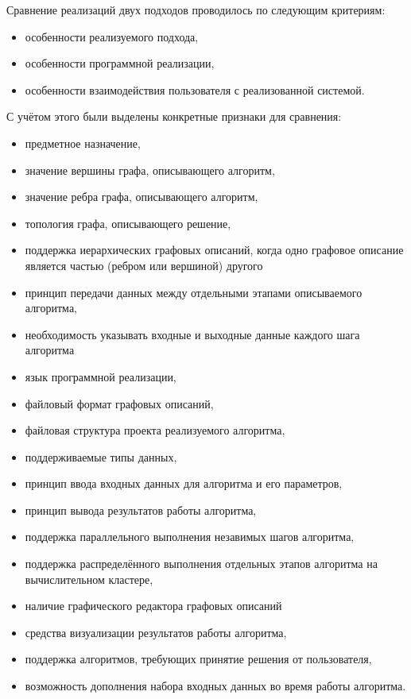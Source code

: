 Сравнение реализаций двух подходов проводилось по следующим критериям:
\begin{itemize}
    \item особенности реализуемого подхода,
    \item особенности программной реализации,
    \item особенности взаимодействия пользователя с реализованной системой.
\end{itemize}
С учётом этого были выделены конкретные признаки для сравнения:
\begin{itemize}
    \item предметное назначение,
    \item значение вершины графа, описывающего алгоритм,
    \item значение ребра графа, описывающего алгоритм,
    \item топология графа, описывающего решение,
    \item поддержка иерархических графовых описаний, когда одно графовое описание является частью (ребром или вершиной) другого
    \item принцип передачи данных между отдельными этапами описываемого алгоритма,
    \item необходимость указывать входные и выходные данные каждого шага алгоритма
    \item язык программной реализации,
    \item файловый формат графовых описаний,
    \item файловая структура проекта реализуемого алгоритма,
    \item поддерживаемые типы данных,
    \item принцип ввода входных данных для алгоритма и его параметров,
    \item принцип вывода результатов работы алгоритма,
    \item поддержка параллельного выполнения незавимых шагов алгоритма,
    \item поддержка распределённого выполнения отдельных этапов алгоритма на вычислительном кластере,
    \item наличие графического редактора графовых описаний
    \item средства визуализации результатов работы алгоритма,
    \item поддержка алгоритмов, требующих принятие решения от пользователя,
    \item возможность дополнения набора входных данных во время работы алгоритма.
\end{itemize}

